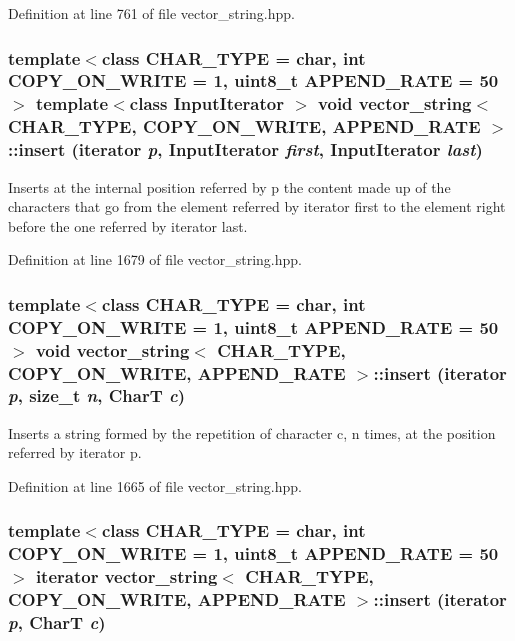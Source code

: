 Definition at line 761 of file vector\_\-string.hpp.\hypertarget{classvector__string_6eb256890eb9c74e68961a837d228011}{
\subsubsection[{insert}]{\setlength{\rightskip}{0pt plus 5cm}template$<$class CHAR\_\-TYPE  = char, int COPY\_\-ON\_\-WRITE = 1, uint8\_\-t APPEND\_\-RATE = 50$>$ template$<$class InputIterator $>$ void {\bf vector\_\-string}$<$ CHAR\_\-TYPE, COPY\_\-ON\_\-WRITE, APPEND\_\-RATE $>$::insert (iterator {\em p}, \/  InputIterator {\em first}, \/  InputIterator {\em last})}}
\label{classvector__string_6eb256890eb9c74e68961a837d228011}


Inserts at the internal position referred by p the content made up of the characters that go from the element referred by iterator first to the element right before the one referred by iterator last. 

Definition at line 1679 of file vector\_\-string.hpp.\hypertarget{classvector__string_0f84ccc1d6e7829d6514c9afeb6ec454}{
\subsubsection[{insert}]{\setlength{\rightskip}{0pt plus 5cm}template$<$class CHAR\_\-TYPE  = char, int COPY\_\-ON\_\-WRITE = 1, uint8\_\-t APPEND\_\-RATE = 50$>$ void {\bf vector\_\-string}$<$ CHAR\_\-TYPE, COPY\_\-ON\_\-WRITE, APPEND\_\-RATE $>$::insert (iterator {\em p}, \/  size\_\-t {\em n}, \/  CharT {\em c})}}
\label{classvector__string_0f84ccc1d6e7829d6514c9afeb6ec454}


Inserts a string formed by the repetition of character c, n times, at the position referred by iterator p. 

Definition at line 1665 of file vector\_\-string.hpp.\hypertarget{classvector__string_6251982b3c851185d13665546d77f7ac}{
\subsubsection[{insert}]{\setlength{\rightskip}{0pt plus 5cm}template$<$class CHAR\_\-TYPE  = char, int COPY\_\-ON\_\-WRITE = 1, uint8\_\-t APPEND\_\-RATE = 50$>$ iterator {\bf vector\_\-string}$<$ CHAR\_\-TYPE, COPY\_\-ON\_\-WRITE, APPEND\_\-RATE $>$::insert (iterator {\em p}, \/  CharT {\em c})}}
\label{classvector__string_6251982b3c851185d13665546d77f7ac}


